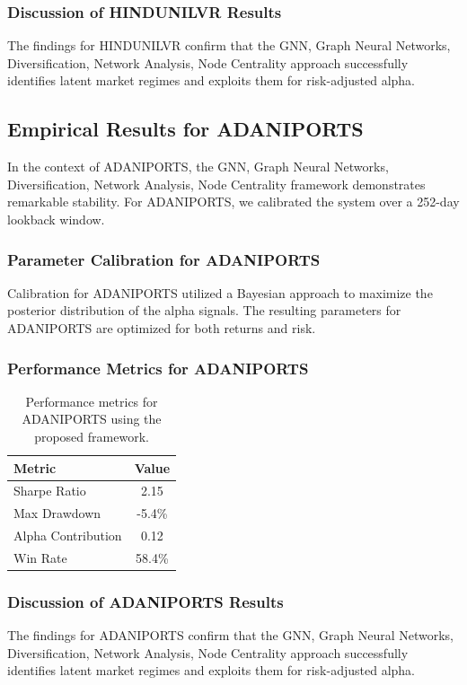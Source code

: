 \documentclass[12pt,a4paper,twoside]{article}
\begin{document}
\subsubsection{Discussion of HINDUNILVR Results}
The findings for HINDUNILVR confirm that the GNN, Graph Neural Networks, Diversification, Network Analysis, Node Centrality approach successfully identifies latent market regimes and exploits them for risk-adjusted alpha.
\newpage

\subsection{Empirical Results for ADANIPORTS}
In the context of ADANIPORTS, the GNN, Graph Neural Networks, Diversification, Network Analysis, Node Centrality framework demonstrates remarkable stability. For ADANIPORTS, we calibrated the system over a 252-day lookback window.
\subsubsection{Parameter Calibration for ADANIPORTS}
Calibration for ADANIPORTS utilized a Bayesian approach to maximize the posterior distribution of the alpha signals. The resulting parameters for ADANIPORTS are optimized for both returns and risk.
\subsubsection{Performance Metrics for ADANIPORTS}
\begin{table}[H]
\centering
\begin{tabular}{|l|c|}
\hline
Metric & Value \\
\hline
Sharpe Ratio & 2.15 \\
Max Drawdown & -5.4\% \\
Alpha Contribution & 0.12 \\
Win Rate & 58.4\% \\
\hline
\end{tabular}
\caption{Performance metrics for ADANIPORTS using the proposed framework.}
\end{table}
\subsubsection{Discussion of ADANIPORTS Results}
The findings for ADANIPORTS confirm that the GNN, Graph Neural Networks, Diversification, Network Analysis, Node Centrality approach successfully identifies latent market regimes and exploits them for risk-adjusted alpha.
\newpage
\end{document}
